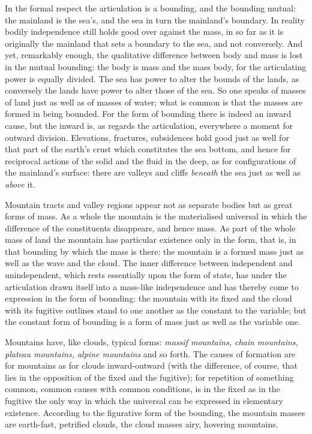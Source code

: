 \documentclass[12pt,a4paper]{book}
\begin{document}
In the formal respect the articulation is a bounding, and the bounding mutual: the mainland is the sea's, and the sea in
turn the mainland's boundary. In reality bodily independence still holds good over against the mass, in so far as it is
originally the mainland that sets a boundary to the sea, and not conversely. And yet, remarkably enough, the qualitative
difference between body and mass is lost in the mutual bounding: the body is mass and the mass body, for the articulating
power is equally divided. The sea has power to alter the bounds of the lands, as conversely the lands have power to alter
those of the sea. So one speaks of masses of land just as well as of masses of water; what is common is that the masses
are formed in being bounded. For the form of bounding there is indeed an inward cause, but the inward is, as regards the
articulation, everywhere a moment for outward division. Elevations, fractures, subsidences hold good just as well for
that part of the earth's crust which constitutes the sea bottom, and hence for reciprocal actions of the solid and the
fluid in the deep, as for configurations of the mainland's surface: there are valleys and cliffs \emph{beneath} the sea
just as well as \emph{above} it.

Mountain tracts and valley regions appear not as separate bodies but as great forms of mass. As a whole the mountain is
the materialised universal in which the difference of the constituents disappears, and hence mass. As part of the whole
mass of land the mountain has particular existence only in the form, that is, in that bounding by which the mass is
there: the mountain is a formed mass just as well as the wave and the cloud. The inner difference between independent and
unindependent, which rests essentially upon the form of state, has under the articulation drawn itself into a mass-like
independence and has thereby come to expression in the form of bounding: the mountain with its fixed and the cloud
with its fugitive outlines stand to one another as the constant to the variable; but the constant form of bounding is a
form of mass just as well as the variable one.

Mountains have, like clouds, typical forms: \emph{massif mountains, chain mountains, plateau mountains, alpine
mountains} and so forth. The causes of formation are for mountains as for clouds inward-outward (with the difference, of
course, that lies in the opposition of the fixed and the fugitive); for repetition of something common, common causes
with common conditions, is in the fixed as in the fugitive the only way in which the universal can be expressed in
elementary existence. According to the figurative form of the bounding, the mountain masses are earth-fast, petrified
clouds, the cloud masses airy, hovering mountains.
\end{document}
